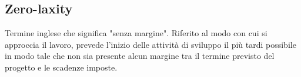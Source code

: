 	\subsection{Zero-laxity}
	\label{sec:zerolaxity}
	Termine inglese che significa "senza margine". Riferito al modo con cui si approccia il lavoro, prevede l'inizio delle attività di sviluppo il più tardi possibile in modo tale che non sia presente alcun margine tra il termine previsto del progetto e le scadenze imposte.



